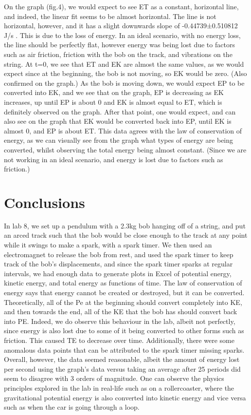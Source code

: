 \documentclass[letterpaper]{article}
\begin{document}
On the graph (fig.4), we would expect to see ET as a constant, horizontal line, and indeed, the linear fit seems to be almost horizontal. The line is not horizontal, however, and it has a slight downwards slope of -0.44739±0.510812 J/s . This is due to the loss of energy. In an ideal scenario, with no energy loss, the line should be perfectly flat, however energy was being lost due to factors such as air friction, friction with the bob on the track, and vibrations on the string. At t=0, we see that ET and EK are almost the same values, as we would expect since at the beginning, the bob is not moving, so EK would be zero. (Also confirmed on the graph.) As the bob is moving down, we would expect EP to be converted into EK, and we see that on the graph, EP is decreasing as EK increases, up until EP is about 0 and EK is almost equal to ET, which is definitely observed on the graph. After that point, one would expect, and can also see on the graph that EK would be converted back into EP, until EK is almost 0, and EP is about ET. This data agrees with the law of conservation of energy, as we can visually see from the graph what types of energy are being converted, whilst observing the total energy being almost constant. (Since we are not working in an ideal scenario, and energy is lost due to factors such as friction.)

\section{Conclusions}
  In lab 8, we set up a pendulum with a 2.3kg bob hanging off of a string, and put an arced track such that the bob would be close enough to the track at any point while it swings to make a spark, with a spark timer. We then used an electromagnet to release the bob from rest, and used the spark timer to keep track of the bob’s displacements, and since the spark timer sparks at regular intervals, we had enough data to generate plots in Excel of potential energy, kinetic energy, and total energy as functions of time. The law of conservation of energy says that energy cannot be created or destroyed, but it can be converted. Theoretically, all of the Pe at the beginning should convert completely into KE, and then towards the end, all of the KE that the bob has should convert back into PE. Indeed, we do observe this behaviour in the lab, albeit not perfectly, since energy is also lost due to some of it being converted to other forms such as friction. This caused TE to decrease over time. Additionally, there were some anomalous data points that can be attributed to the spark timer missing sparks. Overall, however, the data seemed reasonable, albeit the amount of energy lost per second using the graph’s data versus taking an average after 25 periods did seem to disagree with 3 orders of magnitude.  One can observe the physics principles explored in the lab in real-life such as on a rollercoaster, where the gravitational potential energy is also converted into kinetic energy and vice versa such as when the car is going through a loop.

\end{document}
